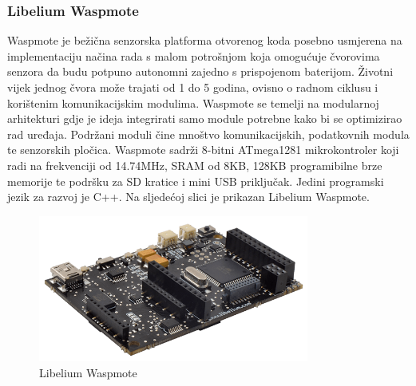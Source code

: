 \documentclass[times, utf8, diplomski]{fer}
\begin{document}
\subsubsection{Libelium Waspmote}
Waspmote\citep{Waspmote} je bežična senzorska platforma otvorenog koda posebno usmjerena na implementaciju načina rada s malom potrošnjom koja omogućuje čvorovima senzora da budu potpuno autonomni zajedno s prispojenom baterijom. Životni vijek jednog čvora može trajati od 1 do 5 godina, ovisno o radnom ciklusu i korištenim komunikacijskim modulima. Waspmote se temelji na modularnoj arhitekturi gdje je ideja integrirati samo module potrebne kako bi se optimizirao rad uređaja. Podržani moduli čine mnoštvo komunikacijskih, podatkovnih modula te senzorskih pločica. Waspmote sadrži 8-bitni ATmega1281 mikrokontroler koji radi na frekvenciji od 14.74MHz, SRAM od 8KB, 128KB programibilne brze memorije te podršku za SD kratice i mini USB priključak. Jedini programski jezik za razvoj je C++. Na sljedećoj slici je prikazan Libelium Waspmote.
\begin{figure}[htb]
    \centering
    \includegraphics[width=8.9cm]{images/waspmote.png}
    \caption{Libelium Waspmote\citep{Waspmote}}
    \label{fig:waspmote}
\end{figure}
\end{document}
